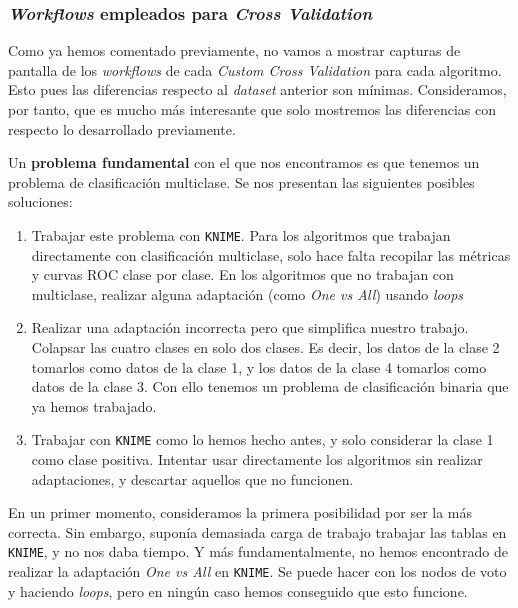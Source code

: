 \documentclass[11pt]{article}
\begin{document}

\subsubsection{\emph{Workflows} empleados para \emph{Cross Validation}} \label{dataset02_decision:seccion}

Como ya hemos comentado previamente, no vamos a mostrar capturas de pantalla de los \emph{workflows} de cada \emph{Custom Cross Validation} para cada algoritmo. Esto pues las diferencias respecto al \emph{dataset} anterior son mínimas. Consideramos, por tanto, que es mucho más interesante que solo mostremos las diferencias con respecto lo desarrollado previamente.

Un \textbf{problema fundamental} con el que nos encontramos es que tenemos un problema de clasificación multiclase. Se nos presentan las siguientes posibles soluciones:

\begin{enumerate}
    \item Trabajar este problema con \lstinline{KNIME}. Para los algoritmos que trabajan directamente con clasificación multiclase, solo hace falta recopilar las métricas y curvas ROC clase por clase. En los algoritmos que no trabajan con multiclase, realizar alguna adaptación (como \emph{One vs All}) usando \emph{loops}
    \item Realizar una adaptación incorrecta pero que simplifica nuestro trabajo. Colapsar las cuatro clases en solo dos clases. Es decir, los datos de la clase 2 tomarlos como datos de la clase 1, y los datos de la clase 4 tomarlos como datos de la clase 3. Con ello tenemos un problema de clasificación binaria que ya hemos trabajado.
    \item Trabajar con \lstinline{KNIME} como lo hemos hecho antes, y solo considerar la clase 1 como clase positiva. Intentar usar directamente los algoritmos sin realizar adaptaciones, y descartar aquellos que no funcionen.
\end{enumerate}

En un primer momento, consideramos la primera posibilidad por ser la más correcta. Sin embargo, suponía demasiada carga de trabajo trabajar las tablas en \lstinline{KNIME}, y no nos daba tiempo. Y más fundamentalmente, no hemos encontrado de realizar la adaptación \emph{One vs All} en \lstinline{KNIME}. Se puede hacer con los nodos de voto y haciendo \emph{loops}, pero en ningún caso hemos conseguido que esto funcione.
\end{document}
